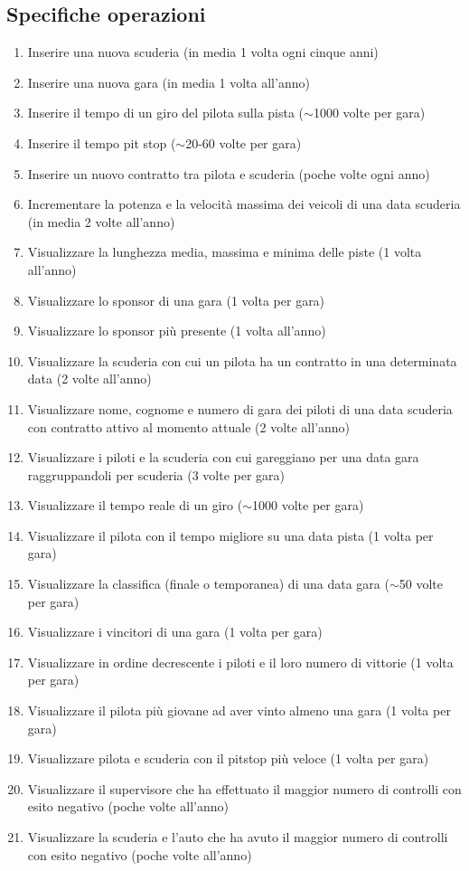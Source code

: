 \documentclass[11pt]{article}
\begin{document}
\subsection{Specifiche operazioni}
\begin{enumerate}
    \item Inserire una nuova scuderia (in media 1 volta ogni cinque anni)
    \item Inserire una nuova gara (in media 1 volta all'anno)
    \item Inserire il tempo di un giro del pilota sulla pista ($\sim$1000 volte per gara)
    \item Inserire il tempo pit stop ($\sim$20-60 volte per gara)
    \item Inserire un nuovo contratto tra pilota e scuderia (poche volte ogni anno)
    \item Incrementare la potenza e la velocità massima dei veicoli di una data scuderia (in media 2 volte all'anno)
    \item Visualizzare la lunghezza media, massima e minima delle piste (1 volta all'anno)
    \item Visualizzare lo sponsor di una gara (1 volta per gara)
    \item Visualizzare lo sponsor più presente (1 volta all'anno)
    \item Visualizzare la scuderia con cui un pilota ha un contratto in una determinata data (2 volte all'anno)
    \item Visualizzare nome, cognome e numero di gara dei piloti di una data scuderia con contratto attivo al momento attuale (2 volte all'anno)
    \item Visualizzare i piloti e la scuderia con cui gareggiano per una data gara raggruppandoli per scuderia (3 volte per gara)
    \item Visualizzare il tempo reale di un giro ($\sim$1000 volte per gara)
    \item Visualizzare il pilota con il tempo migliore su una data pista (1 volta per gara)
    \item Visualizzare la classifica (finale o temporanea) di una data gara ($\sim$50 volte per gara)
    \item Visualizzare i vincitori di una gara (1 volta per gara)
    \item Visualizzare in ordine decrescente i piloti e il loro numero di vittorie (1 volta per gara)
    \item Visualizzare il pilota più giovane ad aver vinto almeno una gara (1 volta per gara)
    \item Visualizzare pilota e scuderia con il pitstop più veloce (1 volta per gara)
    \item Visualizzare il supervisore che ha effettuato il maggior numero di controlli con esito negativo (poche volte all'anno)
    \item Visualizzare la scuderia e l'auto che ha avuto il maggior numero di controlli con esito negativo (poche volte all'anno)
\end{enumerate}
\end{document}
